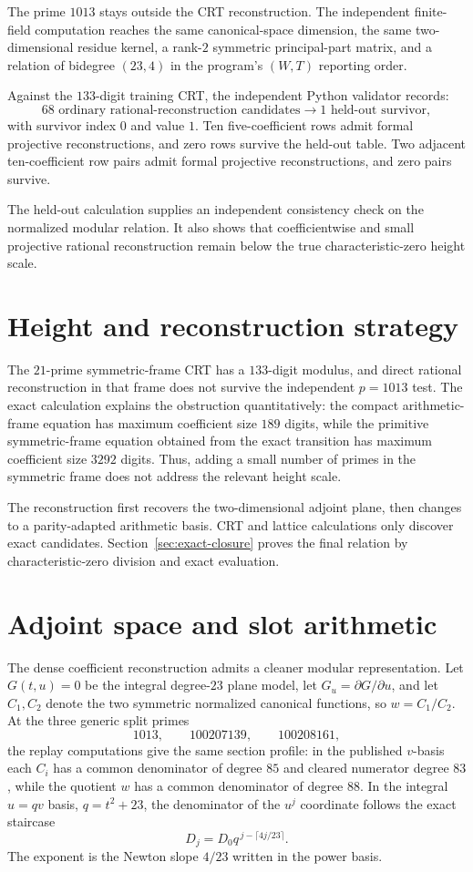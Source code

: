 \documentclass[11pt]{article}
\begin{document}
The prime $1013$ stays outside the CRT reconstruction.  The independent finite-field computation reaches the same canonical-space dimension, the same two-dimensional residue kernel, a rank-$2$ symmetric principal-part matrix, and a relation of bidegree $(23,4)$ in the program's $(W,T)$ reporting order.

Against the $133$-digit training CRT, the independent Python validator records:
\[
 68\text{ ordinary rational-reconstruction candidates}
 \longrightarrow
 \boxed{1\text{ held-out survivor}},
\]
with survivor index $0$ and value $1$.  Ten five-coefficient rows admit formal projective reconstructions, and zero rows survive the held-out table.  Two adjacent ten-coefficient row pairs admit formal projective reconstructions, and zero pairs survive.

The held-out calculation supplies an independent consistency check on the normalized modular relation.  It also shows that coefficientwise and small projective rational reconstruction remain below the true characteristic-zero height scale.

\section{Height and reconstruction strategy}\label{sec:height-strategy}
The $21$-prime symmetric-frame CRT has a $133$-digit modulus, and direct rational reconstruction in that frame does not survive the independent $p=1013$ test.  The exact calculation explains the obstruction quantitatively: the compact arithmetic-frame equation has maximum coefficient size $189$ digits, while the primitive symmetric-frame equation obtained from the exact transition has maximum coefficient size $3292$ digits.  Thus, adding a small number of primes in the symmetric frame does not address the relevant height scale.

The reconstruction first recovers the two-dimensional adjoint plane, then changes to a parity-adapted arithmetic basis.  CRT and lattice calculations only discover exact candidates.  Section~\ref{sec:exact-closure} proves the final relation by characteristic-zero division and exact evaluation.
\section{Adjoint space and slot arithmetic}\label{sec:adjoint}

The dense coefficient reconstruction admits a cleaner modular
representation.  Let $G(t,u)=0$ be the integral degree-$23$ plane model,
let $G_u=\partial G/\partial u$, and let $C_1,C_2$ denote the two
symmetric normalized canonical functions, so $w=C_1/C_2$.  At the three
generic split primes
\[
1013,\qquad100207139,\qquad100208161,
\]
the replay computations give the same section profile: in the published
$v$-basis each $C_i$ has a common denominator of degree $85$ and cleared
numerator degree $83$, while the quotient $w$ has a common denominator of
degree $88$.  In the integral $u=qv$ basis, $q=t^2+23$, the denominator
of the $u^j$ coordinate follows the exact staircase
\[
D_j=D_0q^{\,j-\lceil4j/23\rceil}.
\]
The exponent is the Newton slope $4/23$ written in the power basis.
\end{document}
